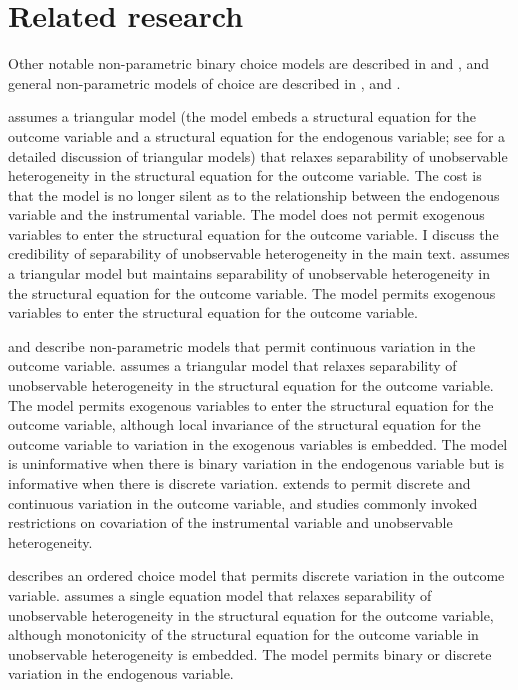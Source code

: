 \documentclass[10pt,a4paper,twoside]{article}
\numberwithin{equation}{section}
\begin{document}
\section*{Related research}
Other notable non-parametric binary choice models are described in \cite{bp97} and \cite{sHvY11}, and general non-parametric models of choice are described in \cite{c05}, \cite{kI09} and \cite{c10}.

\cite{bp97} assumes a triangular model (the model embeds a structural equation for the outcome variable and a structural equation for the endogenous variable; see \cite{sTw60} for a detailed discussion of triangular models) that relaxes separability of unobservable heterogeneity in the structural equation for the outcome variable. The cost is that the model is no longer silent as to the relationship between the endogenous variable and the instrumental variable. The model does not permit exogenous variables to enter the structural equation for the outcome variable. I discuss the credibility of separability of unobservable heterogeneity in the main text. \cite{sHvY11} assumes a triangular model but maintains separability of unobservable heterogeneity in the structural equation for the outcome variable. The model permits exogenous variables to enter the structural equation for the outcome variable.

\cite{c05} and \cite{kI09} describe non-parametric models that permit continuous variation in the outcome variable. \cite{c05} assumes a triangular model that relaxes separability of unobservable heterogeneity in the structural equation for the outcome variable. The model permits exogenous variables to enter the structural equation for the outcome variable, although local invariance of the structural equation for the outcome variable to variation in the exogenous variables is embedded. The model is uninformative when there is binary variation in the endogenous variable but is informative when there is discrete variation. \cite{kI09} extends \cite{bp97} to permit discrete and continuous variation in the outcome variable, and studies commonly invoked restrictions on covariation of the instrumental variable and unobservable heterogeneity.

\cite{c10} describes an ordered choice model that permits discrete variation in the outcome variable. \cite{c10} assumes a single equation model that relaxes separability of unobservable heterogeneity in the structural equation for the outcome variable, although monotonicity of the structural equation for the outcome variable in unobservable heterogeneity is embedded. The model permits binary or discrete variation in the endogenous variable.
\end{document}
